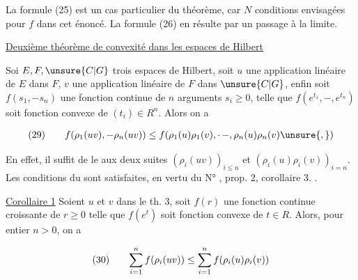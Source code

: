  La formule (25) est un cas particulier du théorème, car $N$  conditions envisagées pour $f$ dans cet énoncé. La formule (26) en résulte par un passage à la limite.

{\reversemarginpar{}}\uline{Deuxième théorème de convexité dans les espaces de Hilbert}

{\reversemarginpar{}}
Soi $E,F,\unsure{C|G}$ trois espaces de Hilbert, soit $u$ une application linéaire  de $E$ dans $F$,  $v$ une application linéaire  de $F$ dans $\unsure{C|G}$,  enfin soit $f(s_1,\mathord{-}s_n)$ une fonction continue  de $n$ arguments $s_i\geq0$, telle que  $f(e^{t_1},\mathord{-},e^{t_n})$ soit fonction convexe de $(t_i)\in R^n$. Alors on a

\[
\begin{array}{@{}l@{\qquad}l@{}}
(29)&\displaystyle f(\rho_1(uv),\mathord{-}\rho_n(uv))\leq f(\rho_1(u)\rho_1(v),\mathord{\cdot}\,\mathord{-},\rho_n(u)\rho_n(v)\unsure{,})
\end{array}
\]

En effet, il suffit de  le   aux deux suites $(\rho_i(uv))_{i\leq n}$ et $(\rho_i(u)\rho_i(v))_{i=n}$. Les conditions  du  sont satisfaites,  en vertu du N° , prop. 2, corollaire 3. .

\uline{Corollaire 1} Soient $u$ et $v$  dans le th. 3, soit $f(r)$ une fonction continue croissante de $r\geq0$ telle que $f(e^t)$ soit fonction convexe de $t\in R$. Alors, pour  entier $n>0$, on a

{\reversemarginpar{}}
{\reversemarginpar{}}
\[
\begin{array}{@{}l@{\qquad}l@{}}
(30)&\displaystyle \sum_{i=1}^n f(\rho_i(uv))\leq\sum_{i=1}^n f(\rho_i(u)\rho_i(v))
\end{array}
\]

